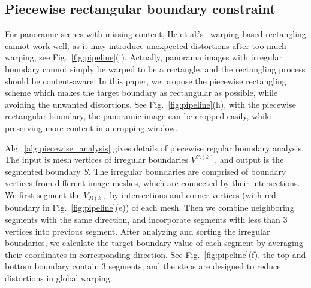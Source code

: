 \documentclass[10pt,journal,compsoc]{IEEEtran}
\begin{document}
\subsection{Piecewise rectangular boundary constraint}
\label{sec:piecewise_boundary}
For panoramic scenes with missing content, He et al.'s~\cite{journals/tog/HeC013} warping-based rectangling cannot work well, as it may introduce unexpected distortions after too much warping, see Fig.~\ref{fig:pipeline}(i).
Actually, panorama images with irregular boundary cannot simply be warped to be a rectangle, and the rectangling process should be content-aware.
In this paper, we propose the piecewise rectangling scheme which makes the target boundary as rectangular as possible, while avoiding the unwanted distortions.
See Fig.~\ref{fig:pipeline}(h), with the piecewise rectangular boundary, the panoramic image can be cropped easily, while preserving more content in a cropping window.

Alg.~\ref{alg:piecewise_analysis} gives details of piecewise regular boundary analysis.
The input is mesh vertices of irregular boundaries $V^{\Re(k)}$, and output is the segmented boundary $S$.
The irregular boundaries are comprised of boundary vertices from different image meshes, which are connected by their intersections.
We first segment the $V_{\Re(k)}$ by intersections and corner vertices (with red boundary in Fig.~\ref{fig:pipeline}(e)) of each mesh.
Then we combine neighboring segments with the same direction, and incorporate segments with less than $3$ vertices into previous segment.
After analyzing and sorting the irregular boundaries, we calculate the target boundary value of each segment by averaging their coordinates in corresponding direction.
See Fig.~\ref{fig:pipeline}(f), the top and bottom boundary contain $3$ segments, and the steps are designed to reduce distortions in global warping.
\end{document}
